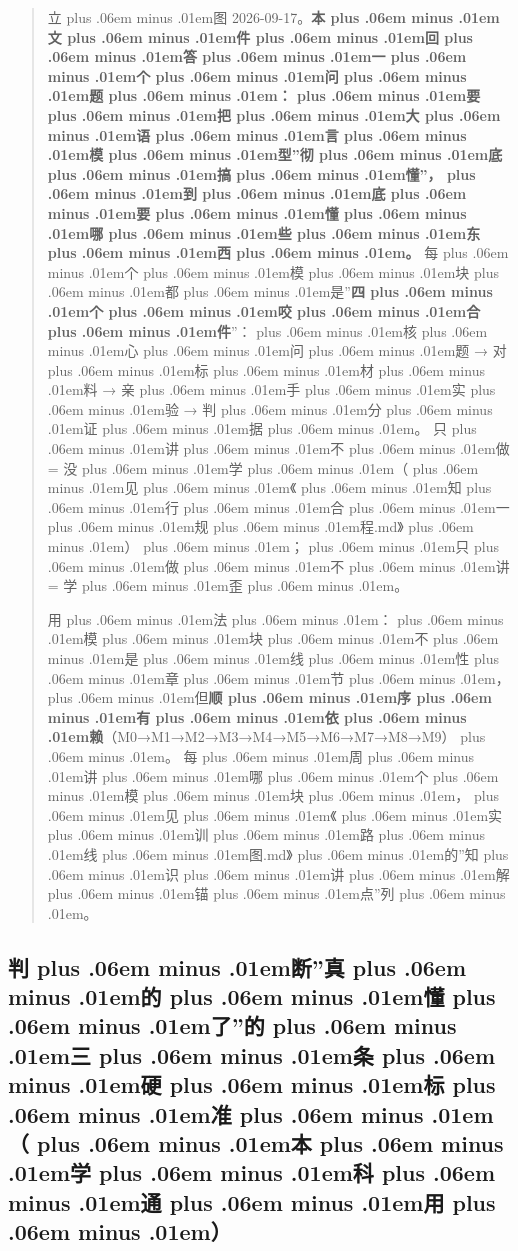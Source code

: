 \documentclass[
]{article}
\def\zh#1{{\zhfont #1}}
\def\sym#1{{\symfont #1}}
\def\zhglue{\hskip0pt plus .06em minus .01em}
\begin{document}
\begin{quote}
\zh{立\zhglue 图} 2026-09-17\zh{。}\textbf{\zh{本\zhglue 文\zhglue 件\zhglue 回\zhglue 答\zhglue 一\zhglue 个\zhglue 问\zhglue 题\zhglue ：\zhglue 要\zhglue 把\zhglue 大\zhglue 语\zhglue 言\zhglue 模\zhglue 型}''\zh{彻\zhglue 底\zhglue 搞\zhglue 懂}''\zh{，\zhglue 到\zhglue 底\zhglue 要\zhglue 懂\zhglue 哪\zhglue 些\zhglue 东\zhglue 西\zhglue 。}} \zh{每\zhglue 个\zhglue 模\zhglue 块\zhglue 都\zhglue 是}''\textbf{\zh{四\zhglue 个\zhglue 咬\zhglue 合\zhglue 件}}''\zh{：\zhglue 核\zhglue 心\zhglue 问\zhglue 题} \sym{→} \zh{对\zhglue 标\zhglue 材\zhglue 料} \sym{→} \zh{亲\zhglue 手\zhglue 实\zhglue 验} \sym{→} \zh{判\zhglue 分\zhglue 证\zhglue 据\zhglue 。} \zh{只\zhglue 讲\zhglue 不\zhglue 做} = \zh{没\zhglue 学\zhglue （\zhglue 见\zhglue 《\zhglue 知\zhglue 行\zhglue 合\zhglue 一\zhglue 规\zhglue 程}.md\zh{》\zhglue ）\zhglue ；\zhglue 只\zhglue 做\zhglue 不\zhglue 讲} = \zh{学\zhglue 歪\zhglue 。}

\zh{用\zhglue 法\zhglue ：\zhglue 模\zhglue 块\zhglue 不\zhglue 是\zhglue 线\zhglue 性\zhglue 章\zhglue 节\zhglue ，\zhglue 但}\textbf{\zh{顺\zhglue 序\zhglue 有\zhglue 依\zhglue 赖}}\zh{（}M0\sym{→}M1\sym{→}M2\sym{→}M3\sym{→}M4\sym{→}M5\sym{→}M6\sym{→}M7\sym{→}M8\sym{→}M9\zh{）\zhglue 。} \zh{每\zhglue 周\zhglue 讲\zhglue 哪\zhglue 个\zhglue 模\zhglue 块\zhglue ，\zhglue 见\zhglue 《\zhglue 实\zhglue 训\zhglue 路\zhglue 线\zhglue 图}.md\zh{》\zhglue 的}''\zh{知\zhglue 识\zhglue 讲\zhglue 解\zhglue 锚\zhglue 点}''\zh{列\zhglue 。}
\end{quote}

\subsection{\zh{判\zhglue 断}''\zh{真\zhglue 的\zhglue 懂\zhglue 了}''\zh{的\zhglue 三\zhglue 条\zhglue 硬\zhglue 标\zhglue 准\zhglue （\zhglue 本\zhglue 学\zhglue 科\zhglue 通\zhglue 用\zhglue ）}}\label{ux5224ux65adux771fux7684ux61c2ux4e86ux7684ux4e09ux6761ux786cux6807ux51c6ux672cux5b66ux79d1ux901aux7528}
\end{document}

